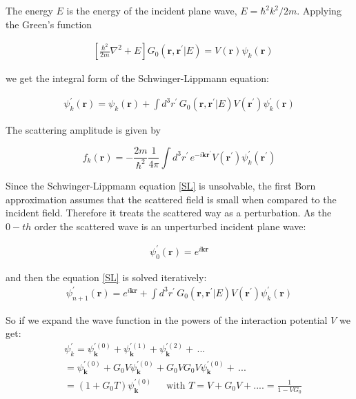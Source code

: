 The energy $ E $ is the energy of the incident plane wave, $ E = \hbar^2k^2/2m $.  Applying the Green's function

\begin{equation}
\begin{split}
& \left[\frac{\hbar^2}{2m}\nabla^2 + E \right]G_0(\mathbf{r}, \mathbf{r}^{'} | E) = V(\mathbf{r}) \psi_k(\mathbf{r}) 
\end{split}
\end{equation}

we get the integral form of the Schwinger-Lippmann equation:

\begin{equation}\label{SL}
\begin{split}
\psi^{'}_k(\mathbf{r}) = \psi_k(\mathbf{r}) + \int{d^3r^{'}\,G_0(\mathbf{r}, \mathbf{r}^{'}| E)V(\mathbf{r}^{'})\psi^{'}_k(\mathbf{r})}
\end{split}
\end{equation}

The scattering amplitude is given by \cite{DWBA}

\begin{equation}\label{fsc}
f_k(\mathbf{r}) = -\frac{2m}{\hbar^2}\frac{1}{4\pi}\int{d^3r^{'}\,e^{-i\mathbf{k}\mathbf{r}^{'}}V(\mathbf{r}^{'})\psi^{'}_k(\mathbf{r}^{'})}
\end{equation}

Since the Schwinger-Lippmann equation \eqref{SL} is unsolvable, the first Born approximation assumes that the scattered field is small when compared to the incident field. Therefore it treats the scattered way as a perturbation. As the $ 0 - th $ order the scattered wave is an unperturbed incident plane wave: 

\begin{equation}
\begin{split}
\psi^{'}_0(\mathbf{r}) = e^{i\mathbf{k}\mathbf{r}}
\end{split}
\end{equation}

and then the equation \eqref{SL} is solved iteratively:
\begin{equation}\label{SLi}
\begin{split}
\psi^{'}_{n+1}(\mathbf{r}) = e^{i\mathbf{k}\mathbf{r}} + \int{d^3r^{'}\,G_0(\mathbf{r}, \mathbf{r}^{'}| E)V(\mathbf{r}^{'})\psi^{'}_k(\mathbf{r}) }
\end{split}
\end{equation}

So if we expand the wave function in the powers of the interaction potential $ V $ we get:
\begin{equation}\label{SLP}
\begin{split}
& \psi^{'}_k = \psi^{'(0)}_{\mathbf{k}} + \psi^{'(1)}_{\mathbf{k}} +  \psi^{'(2)}_{\mathbf{k}} +\, ...\, \\[.8em]
& = \psi^{'(0)}_{\mathbf{k}} + G_0V\psi^{'(0)}_{\mathbf{k}} + G_0VG_0V\psi^{'(0)}_{\mathbf{k}} + \,...\, \\[.8em]
& = (1 + G_0T)\psi^{'(0)}_{\mathbf{k}}\,\,\,\,\,\,\,\text{ with } T = V + G_0V + .... = \frac{1}{1-VG_0}
\end{split}
\end{equation}

